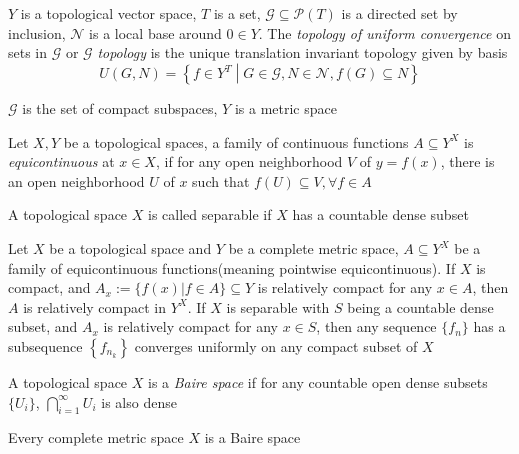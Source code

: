 \documentclass[main]{subfiles}
\begin{document}
\begin{definition}
$Y$ is a topological vector space, $T$ is a set, $\mathcal G\subseteq \mathcal P(T)$ is a directed set by inclusion, $\mathcal N$ is a local base around $0\in Y$. The \textit{topology of uniform convergence} on sets in $\mathcal G$ or $\mathcal G$ \textit{topology} is the unique translation invariant topology given by basis
\[U(G,N)=\left\{f\in Y^T\middle|G\in\mathcal G, N\in\mathcal N,f(G)\subseteq N\right\}\]
\end{definition}

\begin{example}
$\mathcal G$ is the set of compact subspaces, $Y$ is a metric space
\end{example}

\begin{definition}
Let $X,Y$ be a topological spaces, a family of continuous functions $A\subseteq Y^X$ is \textit{equicontinuous} at $x\in X$, if for any open neighborhood $V$ of $y=f(x)$, there is an open neighborhood $U$ of $x$ such that $f(U)\subseteq V,\forall f\in A$
\end{definition}

\begin{definition}
A topological space $X$ is called separable if $X$ has a countable dense subset
\end{definition}

\begin{theorem}\label{Arzela-Ascoli theorem}
Let $X$ be a topological space and $Y$ be a complete metric space, $A\subseteq Y^X$ be a family of equicontinuous functions(meaning pointwise equicontinuous). If $X$ is compact, and $A_x:=\{f(x)|f\in A\}\subseteq Y$ is relatively compact for any $x\in A$, then $A$ is relatively compact in $Y^X$. If $X$ is separable with $S$ being a countable dense subset, and $A_x$ is relatively compact for any $x\in S$, then any sequence $\{f_n\}$ has a subsequence $\left\{f_{n_k}\right\}$ converges uniformly on any compact subset of $X$
\end{theorem}

\begin{definition}
A topological space $X$ is a \textit{Baire space} if for any countable open dense subsets $\{U_i\}$, $\displaystyle\bigcap_{i=1}^\infty U_i$ is also dense
\end{definition}

\begin{theorem}\label{Baire's category theorem}
Every complete metric space $X$ is a Baire space
\end{theorem}
\end{document}

